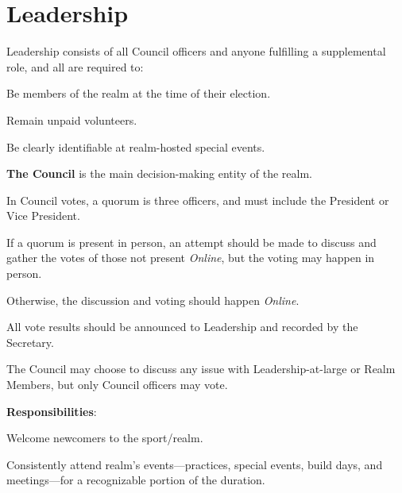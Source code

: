 \documentclass[12pt]{article}
\begin{document}
\section{Leadership}\label{leadership}
\begin{level}
    \item Leadership consists of all Council officers and anyone fulfilling a supplemental role, and all are required to:
    \begin{level}
        \item Be members of the realm at the time of their election.
        \item Remain unpaid volunteers.
        \item Be clearly identifiable at realm-hosted special events.
    \end{level}
    \item \textbf{The Council} is the main decision-making entity of the realm.\label{the_council}
    \begin{level}
        \item {}
        \begin{level}
            \item In Council votes, a quorum is three officers, and must include the President or Vice President. 
            \item If a quorum is present in person, an attempt should be made to discuss and gather the votes of those not present \emph{Online}, but the voting may happen in person.
            \begin{level}
                \item Otherwise, the discussion and voting should happen \emph{Online}.
            \end{level}
            \item All vote results should be announced to Leadership and recorded by the Secretary.
            \item The Council may choose to discuss any issue with Leadership-at-large or Realm Members, but only Council officers may vote.
        \end{level}
        \item \textbf{Responsibilities}:
        \begin{level}
            \item Welcome newcomers to the sport/realm.
            \item Consistently attend realm's events---practices, special events, build days, and meetings---for a recognizable portion of the duration. 

\end{level}
\end{level}
\end{level}
\end{document}
